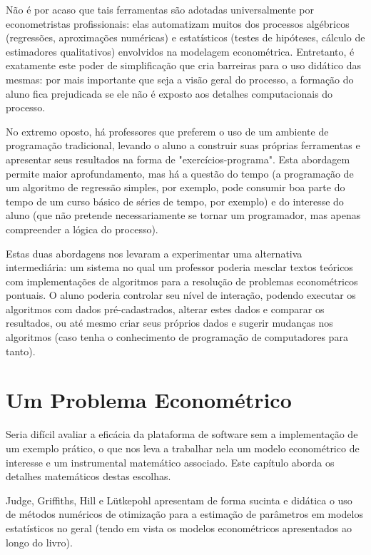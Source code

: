 \documentclass{abnt}
\begin{document}
Não é por acaso que tais ferramentas são adotadas universalmente por econometristas profissionais: elas automatizam muitos dos processos algébricos (regressões, aproximações numéricas) e estatísticos (testes de hipóteses, cálculo de estimadores qualitativos) envolvidos na modelagem econométrica. Entretanto, é exatamente este poder de simplificação que cria barreiras para o uso didático das mesmas: por mais importante que seja a visão geral do processo, a formação do aluno fica prejudicada se ele não é exposto aos detalhes computacionais do processo.

No extremo oposto, há professores que preferem o uso de um ambiente de programação tradicional, levando o aluno a construir suas próprias ferramentas e apresentar seus resultados na forma de "exercícios-programa". Esta abordagem permite maior aprofundamento, mas há a questão do tempo (a programação de um algoritmo de regressão simples, por exemplo, pode consumir boa parte do tempo de um curso básico de séries de tempo, por exemplo) e do interesse do aluno (que não pretende necessariamente se tornar um programador, mas apenas compreender a lógica do processo).

Estas duas abordagens nos levaram a experimentar uma alternativa intermediária: um sistema no qual um professor poderia mesclar textos teóricos com implementações de algoritmos para a resolução de problemas econométricos pontuais. O aluno poderia controlar seu nível de interação, podendo executar os algoritmos com dados pré-cadastrados, alterar estes dados e comparar os resultados, ou até mesmo criar seus próprios dados e sugerir mudanças nos algoritmos (caso tenha o conhecimento de programação de computadores para tanto).

\section {Um Problema Econométrico}

Seria difícil avaliar a eficácia da plataforma de software sem a implementação de um exemplo prático, o que nos leva a trabalhar nela um modelo econométrico de interesse e um instrumental matemático associado. Este capítulo aborda os detalhes matemáticos destas escolhas.

Judge, Griffiths, Hill e Lütkepohl\cite{judge} apresentam de forma sucinta e didática o uso de métodos numéricos de otimização para a estimação de parâmetros em modelos estatísticos no geral (tendo em vista os modelos econométricos apresentados ao longo do livro).
\end{document}
